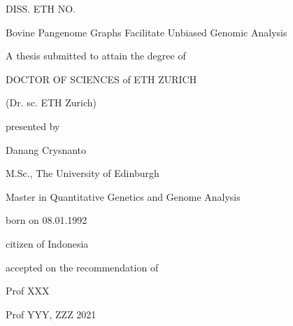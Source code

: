 
%
\begin{center}
    \thispagestyle{plain}

    DISS. ETH NO.     

    \vspace{2cm}

    {\large Bovine Pangenome Graphs Facilitate Unbiased Genomic Analysis}

    \vspace{2cm}
    
    \doublespacing
    A thesis submitted to attain the degree of

    DOCTOR OF SCIENCES of ETH ZURICH

    (Dr. sc. ETH Zurich)
    \vspace{1cm}

    presented by

    \vspace{1cm}
    Danang Crysnanto  

    \vspace{1cm}

    M.Sc., The University of Edinburgh
    
    Master in Quantitative Genetics and Genome Analysis

    \vspace{1cm}

    born on 08.01.1992

    citizen of Indonesia

    \vspace{2cm}

    accepted on the recommendation of     

    Prof XXX 

    Prof YYY, ZZZ 
    \vspace{2cm}
    2021
\end{center}
%